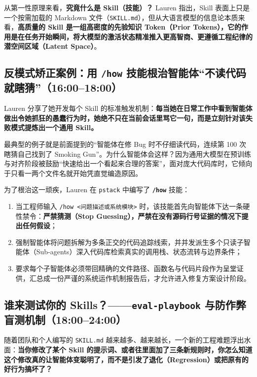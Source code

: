 \documentclass[a4paper]{article}
\begin{document}
从第一性原理来看，\textbf{究竟什么是 Skill（技能）？}
Lauren 指出，Skill 表面上只是一个按需加载的 Markdown 文件（\texttt{SKILL.md}），但从大语言模型的信息论本质来看，\textbf{高质量的 Skill 是一组高密度的先验知识 Token（Prior Tokens），它的作用是在任务开始瞬间，将大模型的激活状态精准推入更高智商、更遵循工程纪律的潜空间区域（Latent Space）}。

\subsection{反模式矫正案例：用 \texttt{/how} 技能根治智能体“不读代码就瞎猜”（16:00--18:00）}

Lauren 分享了她开发每个 Skill 的标准触发机制：\textbf{每当她在日常工作中看到智能体做出令她抓狂的愚蠢行为时，她绝不只在当前会话里骂它一句，而是立刻针对该失败模式提炼出一个通用 Skill。}

最典型的例子就是前面提到的“智能体在修 Bug 时不仔细读代码，连续第 100 次瞎猜自己找到了 Smoking Gun”。为什么智能体会这样？因为通用大模型在预训练与对齐阶段被鼓励“快速给出一个看起来合理的答案”，面对庞大代码库时，它倾向于只看一两个文件名就开始凭直觉编造原因。

为了根治这一顽疾，Lauren 在 \texttt{pstack} 中编写了 \textbf{\texttt{/how}} 技能：
\begin{enumerate}
  \item 当工程师输入 \texttt{/how <问题描述或系统模块>} 时，该技能首先向智能体下达一条硬性禁令：\textbf{严禁猜测（Stop Guessing），严禁在没有源码行号证据的情况下提出任何假设}；
  \item 强制智能体将问题拆解为多条正交的代码追踪线索，并并发派生多个只读子智能体（Sub-agents）深入代码库检索真实的调用栈、状态流转与边界条件；
  \item 要求每个子智能体必须带回精确的文件路径、函数名与代码片段作为呈堂证供，汇总成一份严谨的系统运作机制报告后，才允许进入修复方案设计阶段。
\end{enumerate}

\subsection{谁来测试你的 Skills？——\texttt{eval-playbook} 与防作弊盲测机制（18:00--24:00）}

随着团队和个人编写的 \texttt{SKILL.md} 越来越多、越来越长，一个新的工程难题浮出水面：\textbf{当你修改了某个 Skill 的提示词、或者往里面加了三条新规则时，你怎么知道这个修改真的让智能体变聪明了，而不是引发了退化（Regression）或把原有的好行为搞坏了？}
\end{document}
